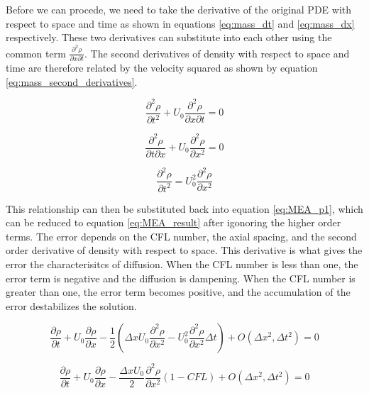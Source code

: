     Before we can procede, we need to take the derivative of the original PDE with respect
    to space and time as shown in equations \ref{eq:mass_dt} and  \ref{eq:mass_dx} 
    respectively. These two derivatives can substitute into each other using the common 
    term $\frac{\partial^2 \rho}{\partial x \partial t}$. The second derivatives of density with 
    respect to space and time are therefore related by the velocity squared as
    shown by equation \ref{eq:mass_second_derivatives}.
    
    \begin{equation}
    \label{eq:mass_dt}
    	 \frac{\partial^2 \rho}{\partial t^2} + U_{0} \frac{\partial^2 \rho}{\partial x \partial t} = 0
    \end{equation}
    
    \begin{equation}
    \label{eq:mass_dx}
    	 \frac{\partial^2 \rho}{\partial t \partial x} + U_{0} \frac{\partial^2 \rho}{\partial x^2} = 0
    \end{equation}
    
    \begin{equation}
    \label{eq:mass_second_derivatives}
    	 \frac{\partial^2 \rho}{\partial t^2} =  U_{0}^2 \frac{\partial^2 \rho}{\partial x^2}
    \end{equation} \linebreak
    
    This relationship can then be substituted back into equation \ref{eq:MEA_p1}, 
    which can be reduced to equation \ref{eq:MEA_result} after igonoring the higher
    order terms. The error depends on the CFL number, the axial spacing, and the
    second order derivative of density with respect to space. This derivative is
    what gives the error the characterisitcs of diffusion. When the CFL number is
    less than one, the error term is negative and the diffusion is dampening. When
    the CFL number is greater than one, the error term becomes positive, and the
    accumulation of the error destabilizes the solution. 
    
    \begin{equation}
    	 \frac{\partial \rho}{\partial t}  +  U_{0} \frac{\partial \rho}{\partial x} - 
    	  \frac{1}{2}  \left(  \Delta x U_{0} \frac{\partial^2 \rho}{\partial
    	  x^2} -   U_{0}^2 \frac{\partial^2 \rho}{\partial x^2} \Delta t  \right) 
    	   + O(\Delta x^{2},\Delta t^{2}) = 0
    \end{equation}
    
    \begin{equation}
    \label{eq:MEA_result}
    	 \frac{\partial \rho}{\partial t}  +  U_{0} \frac{\partial \rho}{\partial x} - 
    	 \frac{\Delta x U_{0}}{2} \frac{\partial^2 \rho}{\partial x^2}  
    	 \left(  1 - CFL  \right) 
    	 + O(\Delta x^{2},\Delta t^{2})  = 0
    \end{equation}
    
